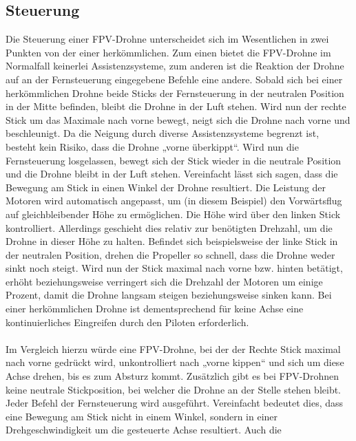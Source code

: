     \newpage
    \subsection[Steuerung]{Steuerung}
        Die Steuerung einer FPV-Drohne unterscheidet sich im Wesentlichen in zwei Punkten von der einer
        herkömmlichen. Zum einen bietet die FPV-Drohne im Normalfall keinerlei Assistenzsysteme, zum anderen
        ist die Reaktion der Drohne auf an der Fernsteuerung eingegebene Befehle eine andere. Sobald sich
        bei einer herkömmlichen Drohne beide Sticks der Fernsteuerung in der neutralen Position in der Mitte
        befinden, bleibt die Drohne in der Luft stehen. Wird nun der rechte Stick um das Maximale nach vorne
        bewegt, neigt sich die Drohne nach vorne und beschleunigt. Da die Neigung durch diverse Assistenzsysteme
        begrenzt ist, besteht kein Risiko, dass die Drohne „vorne überkippt“. Wird nun die Fernsteuerung
        losgelassen, bewegt sich der Stick wieder in die neutrale Position und die Drohne bleibt in der Luft
        stehen. Vereinfacht lässt sich sagen, dass die Bewegung am Stick in einen Winkel der Drohne resultiert.
        Die Leistung der Motoren wird automatisch angepasst, um (in diesem Beispiel) den Vorwärtsflug auf
        gleichbleibender Höhe zu ermöglichen. Die Höhe wird über den linken Stick kontrolliert. Allerdings
        geschieht dies relativ zur benötigten Drehzahl, um die Drohne in dieser Höhe zu halten. Befindet sich
        beispielsweise der linke Stick in der neutralen Position, drehen die Propeller so schnell, dass die
        Drohne weder sinkt noch steigt. Wird nun der Stick maximal nach vorne bzw. hinten betätigt, erhöht
        beziehungsweise verringert sich die Drehzahl der Motoren um einige Prozent, damit die Drohne langsam
        steigen beziehungsweise sinken kann. Bei einer herkömmlichen Drohne ist dementsprechend für keine Achse
        eine kontinuierliches Eingreifen durch den Piloten erforderlich. \\
        \\
        Im Vergleich hierzu würde eine FPV-Drohne, bei der der Rechte Stick maximal nach vorne gedrückt wird,
        unkontrolliert nach „vorne kippen“ und sich um diese Achse drehen, bis es zum Absturz kommt. Zusätzlich
        gibt es bei FPV-Drohnen keine neutrale Stickposition, bei welcher die Drohne an der Stelle stehen bleibt.
        Jeder Befehl der Fernsteuerung wird ausgeführt. Vereinfacht bedeutet dies, dass eine Bewegung am Stick
        nicht in einem Winkel, sondern in einer Drehgeschwindigkeit um die gesteuerte Achse resultiert. Auch die
